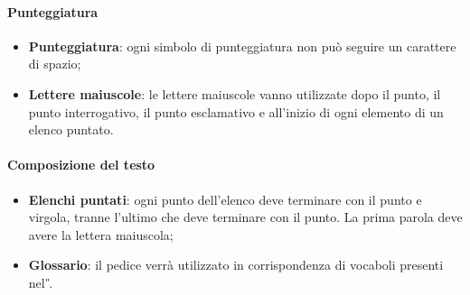 \paragraph{Punteggiatura}
\begin{itemize}
  \item \textbf{Punteggiatura}: ogni simbolo di punteggiatura non può seguire un
  carattere di spazio;
  \item \textbf{Lettere maiuscole}: le lettere maiuscole vanno utilizzate dopo il punto, il punto interrogativo,
  il punto esclamativo e all'inizio di ogni elemento di un elenco puntato.
\end{itemize}
\paragraph{Composizione del testo}
\begin{itemize}
  \item \textbf{Elenchi puntati}: ogni punto dell'elenco deve terminare con il punto e virgola,
   tranne l'ultimo che deve terminare con il punto. La prima parola deve avere la lettera
   maiuscola;
   \item \textbf{Glossario}: il pedice  verrà utilizzato in corrispondenza di vocaboli presenti nel \textit{\G}.
\end{itemize}

